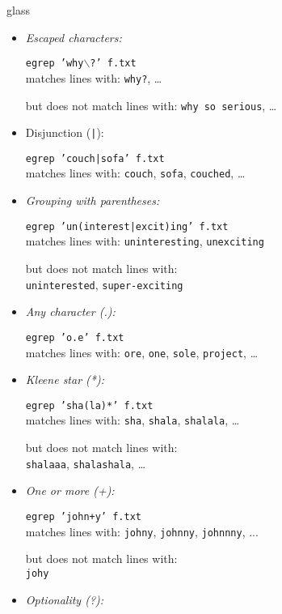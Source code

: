 \begin{tblsfilledsymbol}{}{glass}
\begin{underthehood}
\begin{itemize}
  \item \emph{Escaped characters:} 
    
    \texttt{egrep 'why$\backslash$?' f.txt}\\[1ex]
    matches lines with:
    \texttt{why?}, \ldots

    but does not match lines with:
    \texttt{why so serious}, \ldots

  \item {Disjunction (\texttt{|}):}  

     \texttt{egrep 'couch|sofa' f.txt} \\[1ex]
     matches lines with:
     \texttt{couch}, \texttt{sofa}, \texttt{couched}, \ldots

   \item \emph{Grouping with parentheses:} 
  
  \texttt{egrep 'un(interest|excit)ing' f.txt}\\[1ex]
  matches lines with:
  \texttt{uninteresting}, \texttt{unexciting}

  but does not match lines with:\\[1ex]
  \texttt{uninterested}, \texttt{super-exciting}

\item    
\emph{Any character (.):}
    
  \texttt{egrep 'o.e' f.txt}\\[1ex]
  matches lines with:
  \texttt{ore}, \texttt{one},
  \texttt{sole}, \texttt{project}, \ldots

\item \emph{Kleene star (*):}
    
    \texttt{egrep 'sha(la)*' f.txt}\\[1ex]
    matches lines with:
    \texttt{sha}, \texttt{shala}, \texttt{shalala}, \ldots

    but does not match lines with:\\[1ex]
    \texttt{shalaaa}, \texttt{shalashala}, \ldots

  \item \emph{One or more (+):}
    
    \texttt{egrep 'john+y' f.txt}\\[1ex]
    matches lines with:
    \texttt{johny}, \texttt{johnny}, \texttt{johnnny}, ...

    but does not match lines with:\\[1ex]
    \texttt{johy}

  \item \emph{Optionality (?):}
    

\end{itemize}
\end{underthehood}
\end{tblsfilledsymbol}
